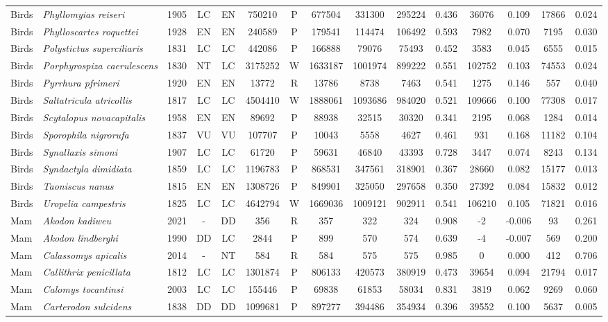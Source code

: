 \documentclass[12pt,openright,oneside,a4paper,english]{abntex2}
\begin{document}
\begin{landscape}
\begin{longtable}{llccccccccccccc}
		Birds&\textit{Phyllomyias reiseri}&1905&LC&EN&750210&P&677504&331300&295224&0.436&36076&0.109&17866&0.024\\
		Birds&\textit{Phylloscartes roquettei}&1928&EN&EN&240589&P&179541&114474&106492&0.593&7982&0.070&7195&0.030\\
		Birds&\textit{Polystictus superciliaris}&1831&LC&LC&442086&P&166888&79076&75493&0.452&3583&0.045&6555&0.015\\
		Birds&\textit{Porphyrospiza caerulescens}&1830&NT&LC&3175252&W&1633187&1001974&899222&0.551&102752&0.103&74553&0.024\\
		Birds&\textit{Pyrrhura pfrimeri}&1920&EN&EN&13772&R&13786&8738&7463&0.541&1275&0.146&557&0.040\\
		Birds&\textit{Saltatricula atricollis}&1817&LC&LC&4504410&W&1888061&1093686&984020&0.521&109666&0.100&77308&0.017\\
		Birds&\textit{Scytalopus novacapitalis}&1958&EN&EN&89692&P&88938&32515&30320&0.341&2195&0.068&1284&0.014\\
		Birds&\textit{Sporophila nigrorufa}&1837&VU&VU&107707&P&10043&5558&4627&0.461&931&0.168&11182&0.104\\
		Birds&\textit{Synallaxis simoni}&1907&LC&LC&61720&P&59631&46840&43393&0.728&3447&0.074&8243&0.134\\
		Birds&\textit{Syndactyla dimidiata}&1859&LC&LC&1196783&P&868531&347561&318901&0.367&28660&0.082&15177&0.013\\
		Birds&\textit{Taoniscus nanus}&1815&EN&EN&1308726&P&849901&325050&297658&0.350&27392&0.084&15832&0.012\\
		Birds&\textit{Uropelia campestris}&1825&LC&LC&4642794&W&1669036&1009121&902911&0.541&106210&0.105&71821&0.016\\
		Mam&\textit{Akodon kadiweu}&2021&-&DD&356&R&357&322&324&0.908&-2&-0.006&93&0.261\\
		Mam&\textit{Akodon lindberghi}&1990&DD&LC&2844&P&899&570&574&0.639&-4&-0.007&569&0.200\\
		Mam&\textit{Calassomys apicalis}&2014&-&NT&584&R&584&575&575&0.985&0&0.000&412&0.706\\
		Mam&\textit{Callithrix penicillata}&1812&LC&LC&1301874&P&806133&420573&380919&0.473&39654&0.094&21794&0.017\\
		Mam&\textit{Calomys tocantinsi}&2003&LC&LC&155446&P&69838&61853&58034&0.831&3819&0.062&9269&0.060\\
		Mam&\textit{Carterodon sulcidens}&1838&DD&DD&1099681&P&897277&394486&354934&0.396&39552&0.100&5637&0.005\\

\end{longtable}
\end{landscape}
\end{document}
